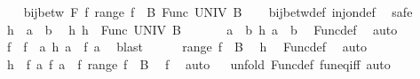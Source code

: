 \begin{isabellebody}
\ \ \isamarkupfalse%
\ {\isachardoublequoteopen}bij{\isacharunderscore}{\kern0pt}betw\ {\isacharquery}{\kern0pt}F\ {\isacharbraceleft}{\kern0pt}f{\isachardot}{\kern0pt}\ range\ f\ {\isasymsubseteq}\ B{\isacharbraceright}{\kern0pt}\ {\isacharparenleft}{\kern0pt}Func\ UNIV\ B{\isacharparenright}{\kern0pt}{\isachardoublequoteclose}\isanewline
\ \ \isamarkupfalse%
\ bij{\isacharunderscore}{\kern0pt}betw{\isacharunderscore}{\kern0pt}def\ inj{\isacharunderscore}{\kern0pt}on{\isacharunderscore}{\kern0pt}def\ \isamarkupfalse%
\ safe\isanewline
\ \ \ \ \isamarkupfalse%
\ h\ {\isacharcolon}{\kern0pt}{\isacharcolon}{\kern0pt}\ {\isachardoublequoteopen}{\isacharprime}{\kern0pt}a\ {\isasymRightarrow}\ {\isacharprime}{\kern0pt}b{\isachardoublequoteclose}\ \isamarkupfalse%
\ h{\isacharcolon}{\kern0pt}\ {\isachardoublequoteopen}h\ {\isasymin}\ Func\ UNIV\ B{\isachardoublequoteclose}\isanewline
\ \ \ \ \isamarkupfalse%
\ {\isachardoublequoteopen}{\isasymforall}\ a{\isachardot}{\kern0pt}\ {\isasymexists}\ b{\isachardot}{\kern0pt}\ h\ a\ {\isacharequal}{\kern0pt}\ b{\isachardoublequoteclose}\ \isamarkupfalse%
\ Func{\isacharunderscore}{\kern0pt}def\ \isamarkupfalse%
\ auto\isanewline
\ \ \ \ \isamarkupfalse%
\ \isamarkupfalse%
\ f\ \ f{\isacharcolon}{\kern0pt}\ {\isachardoublequoteopen}{\isasymforall}\ a{\isachardot}{\kern0pt}\ h\ a\ {\isacharequal}{\kern0pt}\ f\ a{\isachardoublequoteclose}\ \isamarkupfalse%
\ blast\isanewline
\ \ \ \ \isamarkupfalse%
\ {\isachardoublequoteopen}range\ f\ {\isasymsubseteq}\ B{\isachardoublequoteclose}\ \isamarkupfalse%
\ h\ \isamarkupfalse%
\ Func{\isacharunderscore}{\kern0pt}def\ \isamarkupfalse%
\ auto\isanewline
\ \ \ \ \isamarkupfalse%
\ {\isachardoublequoteopen}h\ {\isasymin}\ {\isacharparenleft}{\kern0pt}{\isasymlambda}f\ a{\isachardot}{\kern0pt}\ f\ a{\isacharparenright}{\kern0pt}\ {\isacharbackquote}{\kern0pt}\ {\isacharbraceleft}{\kern0pt}f{\isachardot}{\kern0pt}\ range\ f\ {\isasymsubseteq}\ B{\isacharbraceright}{\kern0pt}{\isachardoublequoteclose}\ \isamarkupfalse%
\ f\ \isamarkupfalse%
\ auto\isanewline
\ \ \isamarkupfalse%
{\isacharparenleft}{\kern0pt}unfold\ Func{\isacharunderscore}{\kern0pt}def\ fun{\isacharunderscore}{\kern0pt}eq{\isacharunderscore}{\kern0pt}iff{\isacharcomma}{\kern0pt}\ auto{\isacharparenright}{\kern0pt}\isanewline

\end{isabellebody}
